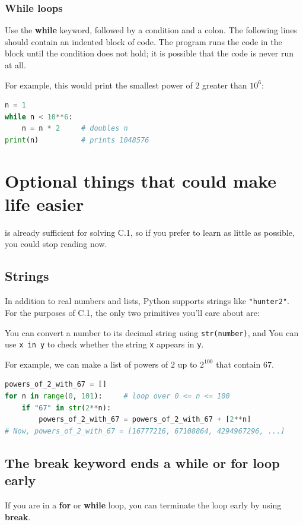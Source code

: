 \documentclass[11pt]{scrartcl}
\begin{document}
\subsubsection{While loops}
Use the \textbf{while} keyword, followed by a condition and a colon.
The following lines should contain an indented block of code.
The program runs the code in the block until the condition does not hold;
it is possible that the code is never run at all.

For example, this would print the smallest power of $2$ greater than $10^6$:
\begin{lstlisting}[language=Python]
n = 1
while n < 10**6:
    n = n * 2     # doubles n
print(n)          # prints 1048576
\end{lstlisting}

\section{Optional things that could make life easier}
 is already sufficient for solving C.1,
so if you prefer to learn as little as possible, you could stop reading now.

\subsection{Strings}
In addition to real numbers and lists, Python supports strings like \texttt{"hunter2"}.
For the purposes of C.1, the only two primitives you'll care about are:
\begin{itemize}
\ii You can convert a number to its decimal string using \texttt{str(number)}, and
\ii You can use \texttt{x in y} to check whether the string \texttt{x} appears in \texttt{y}.
\end{itemize}
For example, we can make a list of powers of $2$ up to $2^{100}$ that contain $67$.
\begin{lstlisting}[language=Python]
powers_of_2_with_67 = []
for n in range(0, 101):     # loop over 0 <= n <= 100
    if "67" in str(2**n):
        powers_of_2_with_67 = powers_of_2_with_67 + [2**n]
# Now, powers_of_2_with_67 = [16777216, 67108864, 4294967296, ...]
\end{lstlisting}

\subsection{The break keyword ends a while or for loop early}
If you are in a \textbf{for} or \textbf{while} loop,
you can terminate the loop early by using \textbf{break}.
\end{document}
